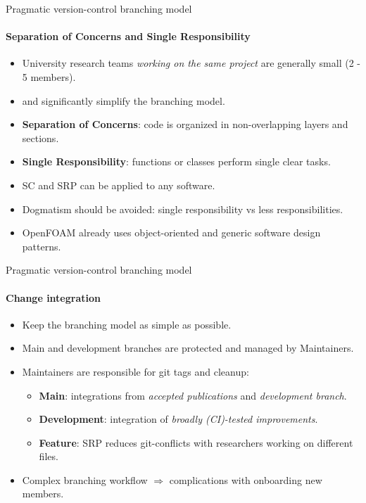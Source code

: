 \documentclass[
	ngerman,%
	aspectratio=169,%
	color={accentcolor=2d},
	logo=true,%
	colorframetitle=true,%
	]{tudabeamer}
\begin{document}
\begin{frame}{Pragmatic version-control branching model} 
    \framesubtitle{Separation of Concerns and Single Responsibility}

	\vfill
	\begin{itemize}

            \item University research teams \emph{working on the same project} are generally small (2 - 5 members).
            \item \href{https://en.wikipedia.org/wiki/Separation_of_concerns}{} and \href{https://en.wikipedia.org/wiki/Single-responsibility_principle}{} significantly simplify the branching model. 

            \item \textbf{Separation of Concerns}: code is organized in non-overlapping layers and sections. 

            \item \textbf{Single Responsibility}: functions or classes perform single clear tasks.

            \item SC and SRP can be applied to any software.
            \item Dogmatism should be avoided: single responsibility vs less responsibilities. 
            \item OpenFOAM already uses object-oriented and generic software design patterns.  

        \end{itemize}
\end{frame}

\begin{frame}{Pragmatic version-control branching model} 
    \framesubtitle{Change integration}

        \vfill

	\begin{itemize}
            \item Keep the branching model as simple as possible.  
            \item Main and development branches are protected and managed by Maintainers. 
            \item Maintainers are responsible for git tags and cleanup: 
            \begin{itemize}
                    \item \textbf{Main}: integrations from \emph{accepted publications} and \emph{development branch}. 
                    \item \textbf{Development}: integration of \emph{broadly (CI)-tested improvements}. 
                    \item \textbf{Feature}: SRP reduces git-conflicts with researchers working on different files.
            \end{itemize}
            \item Complex branching workflow $\Rightarrow$ complications with onboarding new members.
	\end{itemize}

\end{frame}
\end{document}
